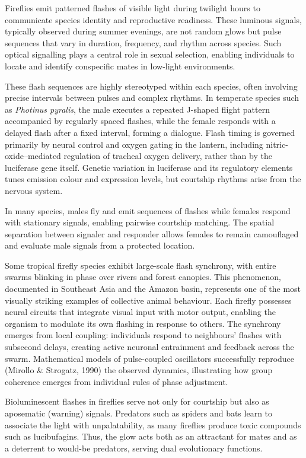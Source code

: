 Fireflies emit patterned flashes of visible light during twilight hours to communicate species identity and reproductive readiness. These luminous signals, typically observed during summer evenings, are not random glows but pulse sequences that vary in duration, frequency, and rhythm across species. Such optical signalling plays a central role in sexual selection, enabling individuals to locate and identify conspecific mates in low-light environments.

These flash sequences are highly stereotyped within each species, often involving precise intervals between pulses and complex rhythms. In temperate species such as \emph{Photinus pyralis}, the male executes a repeated J-shaped flight pattern accompanied by regularly spaced flashes, while the female responds with a delayed flash after a fixed interval, forming a dialogue. Flash timing is governed primarily by neural control and oxygen gating in the lantern, including nitric-oxide–mediated regulation of tracheal oxygen delivery, rather than by the luciferase gene itself. Genetic variation in luciferase and its regulatory elements tunes emission colour and expression levels, but courtship rhythms arise from the nervous system.

In many species, males fly and emit sequences of flashes while females respond with stationary signals, enabling pairwise courtship matching. The spatial separation between signaler and responder allows females to remain camouflaged and evaluate male signals from a protected location.

Some tropical firefly species exhibit large-scale flash synchrony, with entire swarms blinking in phase over rivers and forest canopies. This phenomenon, documented in Southeast Asia and the Amazon basin, represents one of the most visually striking examples of collective animal behaviour. Each firefly possesses neural circuits that integrate visual input with motor output, enabling the organism to modulate its own flashing in response to others. The synchrony emerges from local coupling: individuals respond to neighbours' flashes with subsecond delays, creating active neuronal entrainment and feedback across the swarm. Mathematical models of pulse-coupled oscillators successfully reproduce (Mirollo \& Strogatz, 1990) the observed dynamics, illustrating how group coherence emerges from individual rules of phase adjustment.

Bioluminescent flashes in fireflies serve not only for courtship but also as aposematic (warning) signals. Predators such as spiders and bats learn to associate the light with unpalatability, as many fireflies produce toxic compounds such as lucibufagins. Thus, the glow acts both as an attractant for mates and as a deterrent to would-be predators, serving dual evolutionary functions.

